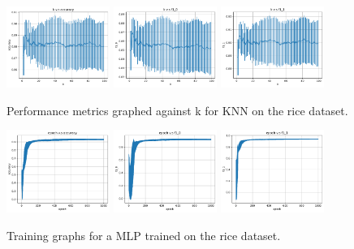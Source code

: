 \begin{figure}
    \centering
    \includegraphics[width=0.30\textwidth]{figures/rice_knn_accuracy.pdf}
    \includegraphics[width=0.30\textwidth]{figures/rice_knn_f1_0.pdf}
    \includegraphics[width=0.30\textwidth]{figures/rice_knn_f1_1.pdf}
    \caption{Performance metrics graphed against k for KNN on the rice dataset.}
    \label{fig:rice_knn}
\end{figure}

\begin{figure}
    \centering
    \includegraphics[width=0.30\textwidth]{figures/rice_nn_accuracy.pdf}
    \includegraphics[width=0.30\textwidth]{figures/rice_nn_f1_0.pdf}
    \includegraphics[width=0.30\textwidth]{figures/rice_nn_f1_1.pdf}
    \caption{Training graphs for a MLP trained on the rice dataset.}
    \label{fig:rice_nn}
\end{figure}

